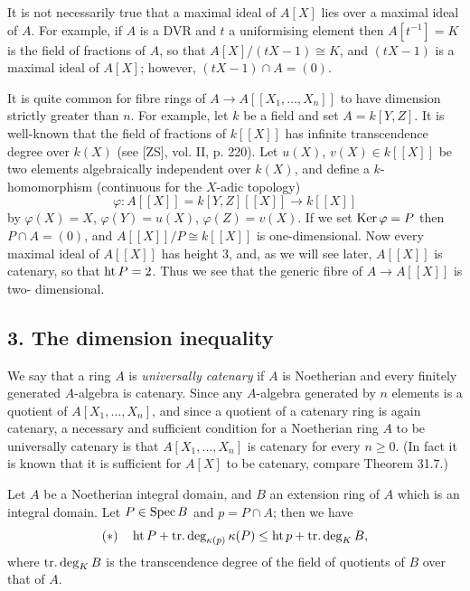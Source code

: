 \begin{remark}
It is not necessarily true that a maximal ideal of $A[X]$ lies
over a maximal ideal of $A$. For example, if $A$ is a DVR and $t$ a
uniformising element then $A[t^{-1}] = K$ is the field of fractions of $A$, so
that $A[X]/(tX - 1) \cong K$, and $(tX - 1)$ is a maximal ideal of $A[X]$; however,
$(tX - 1) \cap A = (0)$.
\end{remark}

\begin{remark}
It is quite common for fibre rings of $A \to A[[X_1, \ldots, X_n]]$
to have dimension strictly greater than $n$. For example, let $k$ be a field and
set $A = k[Y, Z]$. It is well-known that the field of fractions of $k[[X]]$ has
infinite transcendence degree over $k(X)$ (see [ZS], vol. II, p. 220). Let $u(X)$,
$v(X) \in k[[X]]$ be two elements algebraically independent over $k(X)$, and
define a $k$-homomorphism (continuous for the $X$-adic topology)
\[
  \varphi\colon A[[X]] = k[Y, Z][[X]] \to k[[X]]
\]
by $\varphi(X) = X$, $\varphi(Y) = u(X)$, $\varphi(Z) = v(X)$. If we set $\operatorname{Ker} \varphi = P$ then $P \cap A = (0)$,
and $A[[X]]/P \cong k[[X]]$ is one-dimensional. Now every maximal ideal of
$A[[X]]$ has height $3$, and, as we will see later, $A[[X]]$ is catenary, so that
$\operatorname{ht} P = 2$. Thus we see that the generic fibre of $A \to A[[X]]$ is two-
dimensional.
\end{remark}

\subsection*{3. The dimension inequality}

We say that a ring $A$ is \emph{universally catenary} if $A$ is Noetherian and every
finitely generated $A$-algebra is catenary. Since any $A$-algebra generated
by $n$ elements is a quotient of $A[X_1, \ldots, X_n]$, and since a quotient of a
catenary ring is again catenary, a necessary and sufficient condition for a
Noetherian ring $A$ to be universally catenary is that $A[X_1, \ldots, X_n]$ is
catenary for every $n \ge 0$. (In fact it is known that it is sufficient for $A[X]$
to be catenary, compare Theorem 31.7.)

\begin{theorem}\label{thm:15.5}
Let $A$ be a Noetherian integral domain, and
$B$ an extension ring of $A$ which is an integral domain. Let $P \in \operatorname{Spec} B$ and
$p = P \cap A$; then we have
\[
  (*) \quad \operatorname{ht} P + \operatorname{tr.deg}_{\kappa(p)} \kappa(P) \le \operatorname{ht} p + \operatorname{tr.deg}_K B,
\]
where $\operatorname{tr.deg}_K B$ is the transcendence degree of the field of quotients of $B$
over that of $A$.
\end{theorem}

